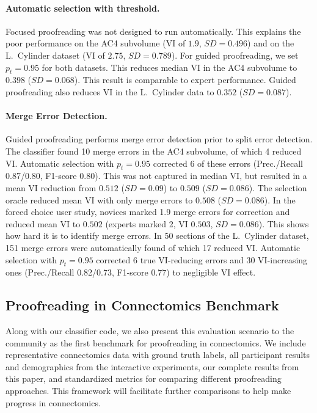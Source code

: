 \vspace{-.35mm}

\paragraph{Automatic selection with threshold.} Focused proofreading was not designed to run automatically. This explains the poor performance on the AC4 subvolume (VI of $1.9$, $SD=0.496$) and on the L.~Cylinder dataset (VI of $2.75$, $SD=0.789$). For guided proofreading, we set $p_t=0.95$ for both datasets. This reduces median VI in the AC4 subvolume to $0.398$ ($SD=0.068$). This result is comparable to expert performance. Guided proofreading also reduces VI in the L.~Cylinder data to $0.352$ ($SD=0.087$).

\vspace{-4mm}

\paragraph{Merge Error Detection.} Guided proofreading performs merge error detection prior to split error detection. The classifier found 10 merge errors in the AC4 subvolume, of which 4 reduced VI. Automatic selection with $p_t=0.95$ corrected 6 of these errors (Prec./Recall 0.87/0.80, F1-score 0.80). This was not captured in median VI, but resulted in a mean VI reduction from $0.512$ ($SD=0.09$) to $0.509$ ($SD=0.086$). The selection oracle reduced mean VI with only merge errors to $0.508$ ($SD=0.086$). In the forced choice user study, novices marked 1.9 merge errors for correction and reduced mean VI to $0.502$ (experts marked 2, VI $0.503$, $SD=0.086$). This shows how hard it is to identify merge errors. In 50 sections of the L.~Cylinder dataset, 151 merge errors were automatically found of which 17 reduced VI. Automatic selection with $p_t=0.95$ corrected 6 true VI-reducing errors and 30 VI-increasing ones (Prec./Recall 0.82/0.73, F1-score 0.77) to negligible VI effect. 

\vspace{-1mm}

\subsection{Proofreading in Connectomics Benchmark}

Along with our classifier code, we also present this evaluation scenario to the community as the first benchmark for proofreading in connectomics. We include representative connectomics data with ground truth labels, all participant results and demographics from the interactive experiments, our complete results from this paper, and standardized metrics for comparing different proofreading approaches. This framework will facilitate further comparisons to help make progress in connectomics.

